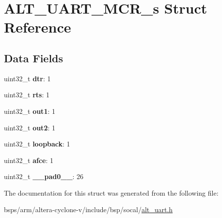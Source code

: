 \hypertarget{structALT__UART__MCR__s}{}\section{A\+L\+T\+\_\+\+U\+A\+R\+T\+\_\+\+M\+C\+R\+\_\+s Struct Reference}
\label{structALT__UART__MCR__s}
\subsection*{Data Fields}
\begin{DoxyCompactItemize}
\item 
\mbox{\label{structALT__UART__MCR__s_a6c1f123bc1d7a8f67c8f9e0a88e181b7}} 
uint32\+\_\+t {\bfseries dtr}\+: 1
\item 
\mbox{\label{structALT__UART__MCR__s_a50bbe3db12ba8fab5e7d93f5f70bbdb8}} 
uint32\+\_\+t {\bfseries rts}\+: 1
\item 
\mbox{\label{structALT__UART__MCR__s_a18548674202c92a2f76a21630e71f272}} 
uint32\+\_\+t {\bfseries out1}\+: 1
\item 
\mbox{\label{structALT__UART__MCR__s_a5f23b5251fab502c6ab1cdb2b137bf14}} 
uint32\+\_\+t {\bfseries out2}\+: 1
\item 
\mbox{\label{structALT__UART__MCR__s_a8d8af91aad36b0d547589439a376e211}} 
uint32\+\_\+t {\bfseries loopback}\+: 1
\item 
\mbox{\label{structALT__UART__MCR__s_a7f957f4bf19ba12439735a8ab7a272c8}} 
uint32\+\_\+t {\bfseries afce}\+: 1
\item 
\mbox{\label{structALT__UART__MCR__s_a8483063131415279f2ae1ae643113883}} 
uint32\+\_\+t {\bfseries \+\_\+\+\_\+pad0\+\_\+\+\_\+}\+: 26
\end{DoxyCompactItemize}


The documentation for this struct was generated from the following file\+:\begin{DoxyCompactItemize}
\item 
bsps/arm/altera-\/cyclone-\/v/include/bsp/socal/\mbox{\hyperlink{alt__uart_8h}{alt\+\_\+uart.\+h}}\end{DoxyCompactItemize}
